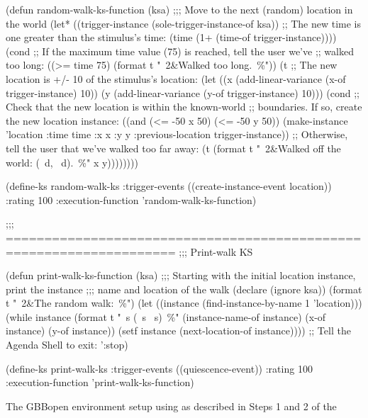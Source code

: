 \documentclass[10pt,twoside,english,pdftex]{article}
\begin{document}
\begin{tightitemize}
\begin{example}
  (defun random-walk-ks-function (ksa)
    ;;; Move to the next (random) location in the world
    (let* ((trigger-instance (sole-trigger-instance-of ksa))
           ;; The new time is one greater than the stimulus's time:
           (time (1+ (time-of trigger-instance))))
      (cond
       ;; If the maximum time value (75) is reached, tell the user we've
       ;; walked too long:
       ((>= time 75) (format t "~2&Walked too long.~\%"))
       (t ;; The new location is +/- 10 of the stimulus's location:
        (let ((x (add-linear-variance (x-of trigger-instance) 10))
              (y (add-linear-variance (y-of trigger-instance) 10)))
          (cond
           ;; Check that the new location is within the known-world
           ;; boundaries.  If so, create the new location instance:
           ((and (<= -50 x 50) (<= -50 y 50))
            (make-instance 'location 
              :time time 
              :x x 
              :y y
              :previous-location trigger-instance))
           ;; Otherwise, tell the user that we've walked too far away:
           (t (format t "~2\&Walked off the world: (~d, ~d).~\%" x y))))))))

  (define-ks random-walk-ks
      :trigger-events ((create-instance-event location))
      :rating 100
      :execution-function 'random-walk-ks-function)

  ;;; ====================================================================
  ;;;   Print-walk KS

  (defun print-walk-ks-function (ksa)
    ;;; Starting with the initial location instance, print the instance
    ;;; name and location of the walk
    (declare (ignore ksa))
    (format t "~2\&The random walk:~\%")
    (let ((instance (find-instance-by-name 1 'location)))
      (while instance
        (format t "~s (~s ~s)~\%"
                (instance-name-of instance)
                (x-of instance)
                (y-of instance))
        (setf instance (next-location-of instance))))
    ;; Tell the Agenda Shell to exit:
    ':stop)

  (define-ks print-walk-ks
    :trigger-events ((quiescence-event))
    :rating 100
    :execution-function 'print-walk-ks-function)
\end{example}

\item The GBBopen environment setup using
   as described in Steps 1 and 2
  of the 
\end{tightitemize}
\end{document}
